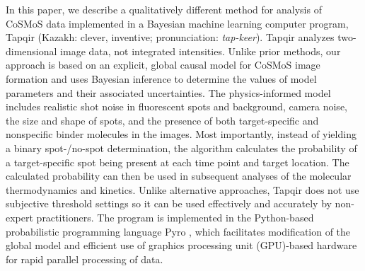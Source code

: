 

In this paper, we describe a qualitatively different method for analysis of CoSMoS data implemented in a Bayesian machine learning computer program, Tapqir (Kazakh: clever, inventive; pronunciation: \emph{tap-keer}). Tapqir analyzes two-dimensional image data, not integrated intensities.  Unlike prior methods, our approach is based on an explicit, global causal model for CoSMoS image formation and uses Bayesian inference \citep{Kinz-Thompson2021-tb} to determine the values of model parameters and their associated uncertainties. The physics-informed model includes realistic shot noise in fluorescent spots and background, camera noise, the size and shape of spots, and the presence of both target-specific and nonspecific binder molecules in the images. Most importantly, instead of yielding a binary spot-/no-spot determination, the algorithm calculates the probability of a target-specific spot being present at each time point and target location. The calculated probability can then be used in subsequent analyses of the molecular thermodynamics and kinetics. Unlike alternative approaches, Tapqir does not use subjective threshold settings so it can be used effectively and accurately by non-expert practitioners. The program is implemented in the Python-based probabilistic programming language Pyro \citep{Bingham2019-qy}, which facilitates modification of the global model and efficient use of graphics processing unit (GPU)-based hardware for rapid parallel processing of data. 